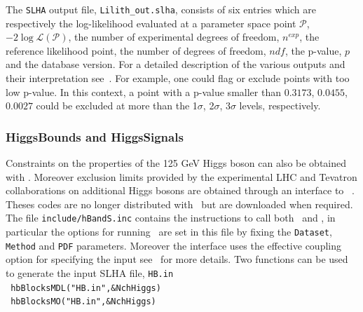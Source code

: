 \documentclass[12pt,a4paper]{article}
\begin{document}
The {\tt SLHA} output file, \verb|Lilith_out.slha|, consists of six entries which are respectively the log-likelihood evaluated at a parameter space point $\mathcal{P}$, $-2\log\mathcal{L}(\mathcal{P})$, the number of experimental degrees of freedom, $n^{exp}$, the reference likelihood point,  the number of degrees of freedom, $ndf$, the p-value, $p$ and the database version.
For a detailed description of the various outputs and their interpretation see~\cite{Bernon:2015hsa,Kraml:2019sis}. For example, one could flag or exclude points with too low p-value. In this context, a point with a p-value smaller than $0.3173$, $0.0455$, $0.0027$ could be excluded at more than the 1$\sigma$, 2$\sigma$, 3$\sigma$ levels, respectively.


\subsubsection{HiggsBounds and HiggsSignals}

Constraints on the properties of the 125 GeV Higgs boson can also  be obtained with \HS.
Moreover exclusion limits provided by the experimental LHC and Tevatron collaborations on additional Higgs bosons are obtained through an interface to \HB~\cite{Bechtle:2011sb}.
Theses codes are no longer distributed with \micro\ but are downloaded when required. 
The file {\tt include/hBandS.inc}  contains the instructions  to call both \HB\ and \HS,  in particular the options for running \HS\ are set in this file by  fixing the  \verb|Dataset|, \verb|Method| and
\verb|PDF| parameters. Moreover the interface uses  the effective coupling option for specifying the input see~\cite{Bechtle:2013wla} for more details. 
Two  functions can be used to generate the input SLHA file, \verb|HB.in|\\

\noindent
\verb| hbBlocksMDL("HB.in",&NchHiggs) | \\
\verb| hbBlocksMO("HB.in",&NchHiggs) | \\
\end{document}
